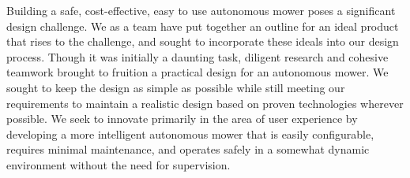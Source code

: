 \documentclass[12pt,letterpaper]{article}
\begin{document}
Building a safe, cost-effective, easy to use autonomous mower poses a
significant design challenge.  We as a team have put together an outline for an
ideal product that rises to the challenge, and sought to incorporate these
ideals into our design process.  Though it was initially a daunting task,
diligent research and cohesive teamwork brought to fruition a practical design
for an autonomous mower.  We sought to keep the design as simple as possible
while still meeting our requirements to maintain a realistic design based on
proven technologies wherever possible.  We seek to innovate primarily in the
area of user experience by developing a more intelligent autonomous mower that
is easily configurable, requires minimal maintenance, and operates safely in a
somewhat dynamic environment without the need for supervision.
\end{document}
